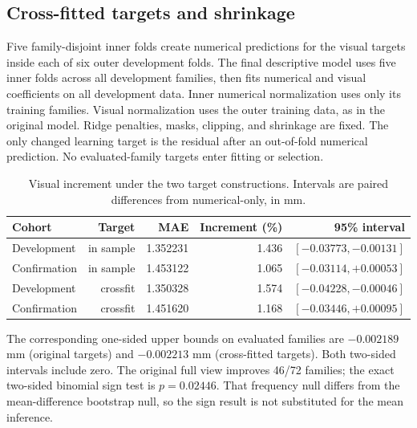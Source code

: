 \subsection{Cross-fitted targets and shrinkage}
Five family-disjoint inner folds create numerical predictions for the visual targets inside each of six outer development folds. The final descriptive model uses five inner folds across all development families, then fits numerical and visual coefficients on all development data. Inner numerical normalization uses only its training families. Visual normalization uses the outer training data, as in the original model. Ridge penalties, masks, clipping, and shrinkage are fixed. The only changed learning target is the residual after an out-of-fold numerical prediction. No evaluated-family targets enter fitting or selection.
\begin{table}[htbp]\centering\small
\caption{Visual increment under the two target constructions. Intervals are paired differences from numerical-only, in mm.}\label{tab:ext_crossfit}
\begin{tabular}{lrrrr}\toprule
Cohort & Target & MAE & Increment (\%) & 95\% interval\\\midrule
Development & in sample & 1.352231 & 1.436 & $[-0.03773,-0.00131]$\\
Confirmation & in sample & 1.453122 & 1.065 & $[-0.03114,+0.00053]$\\
Development & crossfit & 1.350328 & 1.574 & $[-0.04228,-0.00046]$\\
Confirmation & crossfit & 1.451620 & 1.168 & $[-0.03446,+0.00095]$\\
\bottomrule\end{tabular}
\end{table}
The corresponding one-sided upper bounds on evaluated families are $-0.002189$ mm (original targets) and $-0.002213$ mm (cross-fitted targets). Both two-sided intervals include zero. The original full view improves 46/72 families; the exact two-sided binomial sign test is $p=0.02446$. That frequency null differs from the mean-difference bootstrap null, so the sign result is not substituted for the mean inference.

